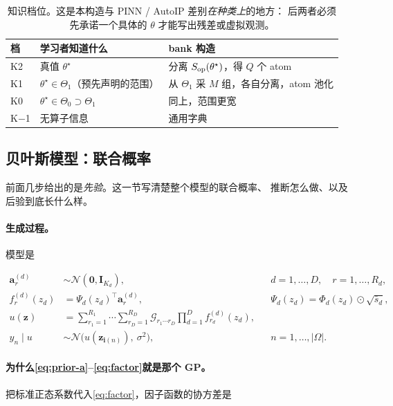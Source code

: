 \documentclass[11pt,a4paper]{article}
\begin{document}
\begin{table}[t]
\centering
\caption{知识档位。这是本构造与 PINN / AutoIP 差别\emph{在种类上}的地方：
后两者必须先承诺一个具体的 $\theta$ 才能写出残差或虚拟观测。}
\label{tab:ladder-def}
\begin{tabular}{lll}
\toprule
档 & 学习者知道什么 & bank 构造 \\
\midrule
K2 & 真值 $\theta^\star$ & 分离 $S_{\mathrm{op}}(\theta^\star)$，得 $Q$ 个 atom \\
K1 & $\theta^\star \in \Theta_1$（预先声明的范围） & 从 $\Theta_1$ 采 $M$ 组，各自分离，atom 池化 \\
K0 & $\theta^\star \in \Theta_0 \supset \Theta_1$ & 同上，范围更宽 \\
K$-$1 & 无算子信息 & 通用字典 \\
\bottomrule
\end{tabular}
\end{table}

\subsection{贝叶斯模型：联合概率}
\label{sec:joint}

前面几步给出的是\emph{先验}。这一节写清楚整个模型的联合概率、
推断怎么做、以及后验到底长什么样。

\paragraph{生成过程。}模型是

\begin{align}
\mathbf{a}^{(d)}_r &\sim \mathcal{N}(\mathbf{0}, \mathbf{I}_{K_d}),
  && d = 1,\dots,D,\quad r = 1,\dots,R_d, \label{eq:prior-a}\\
f^{(d)}_r(z_d) &= \Psi_d(z_d)^\top \mathbf{a}^{(d)}_r,
  && \Psi_d(z_d) = \Phi_d(z_d) \odot \sqrt{\bar{s}_d}, \label{eq:factor}\\
u(\mathbf{z}) &= \sum_{r_1=1}^{R_1}\cdots\sum_{r_D=1}^{R_D}
  \mathcal{G}_{r_1\cdots r_D} \prod_{d=1}^{D} f^{(d)}_{r_d}(z_d), \label{eq:field}\\
y_n \mid u &\sim \mathcal{N}\bigl(u(\mathbf{z}_{\mathbf{i}(n)}),\ \sigma^2\bigr),
  && n = 1,\dots,\lvert\Omega\rvert. \label{eq:lik}
\end{align}

\paragraph{为什么\cref{eq:prior-a}--\cref{eq:factor}就是那个 GP。}
把标准正态系数代入\cref{eq:factor}，因子函数的协方差是
\end{document}
